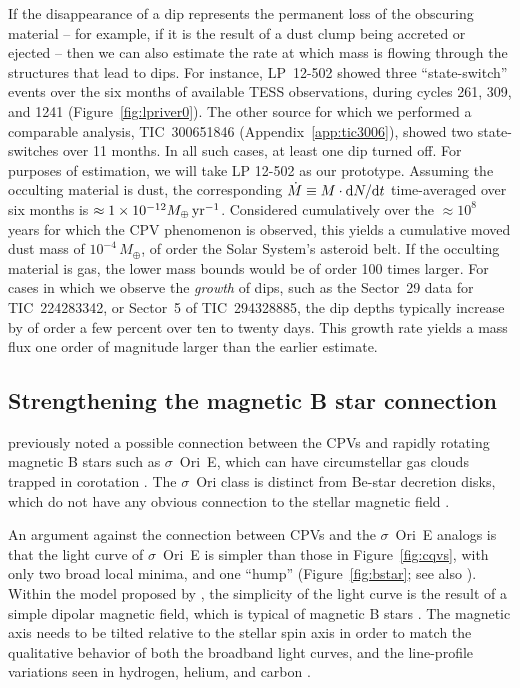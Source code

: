 \documentclass[11pt,twocolumn,tighten]{aastex63}
\begin{document}
If the disappearance of a dip represents the permanent loss of the
obscuring material -- for example, if it is the result of a dust clump
being accreted or ejected -- then we can also estimate the rate at
which mass is flowing through the structures that lead to dips.  For
instance, LP~12-502 showed three ``state-switch'' events over the six
months of available TESS observations, during cycles 261, 309, and
1241 (Figure~\ref{fig:lpriver0}).  The other source for which we
performed a comparable analysis, TIC~300651846
(Appendix~\ref{app:tic3006}), showed two state-switches over 11
months.  In all such cases, at least one dip turned off.  For purposes
of estimation, we will take LP 12-502 as our prototype.  Assuming the
occulting material is dust, the corresponding $\dot{M} \equiv M\cdot
{\rm d}N/{\rm d}t$ time-averaged over six months is
$\approx
1\times10^{-12} M_\oplus\,{\rm yr}^{-1}$.  Considered cumulatively
over the $\approx$$10^8$ years for which the CPV phenomenon is
observed, this yields a cumulative moved dust mass of
$10^{-4}\,M_\oplus$, of order the Solar System's asteroid belt.  If
the occulting material is gas, the lower mass bounds would be of order
100 times larger.  For cases in which we observe the {\it growth} of
dips, such as the Sector~29 data for TIC~224283342, or Sector~5 of
TIC~294328885, the dip depths typically increase by of order a few
percent over ten to twenty days.  This growth rate yields a mass flux
one order of magnitude larger than the earlier estimate.



\subsection{Strengthening the magnetic B star connection}

\citet{2017AJ....153..152S} previously noted a possible connection
between the CPVs and rapidly rotating magnetic B stars such as
$\sigma$~Ori~E, which can have circumstellar gas clouds trapped in
corotation \citep{2005ApJ...630L..81T}.  The $\sigma$~Ori class is
distinct from Be-star decretion disks, which do not have any obvious
connection to the stellar magnetic field \citep{2013A&ARv..21...69R}.

An argument against the connection between CPVs and the $\sigma$~Ori~E
analogs is that the light curve of $\sigma$~Ori~E is simpler than
those in Figure~\ref{fig:cqvs}, with only two broad local minima, and
one ``hump'' (Figure~\ref{fig:bstar}; see also
\citealt{2022ApJ...924L..10J}).  Within the model proposed by
\citeauthor{2005ApJ...630L..81T}, the simplicity of the light curve is
the result of a simple dipolar magnetic field, which is typical of
magnetic B stars \citep{2007A&A...475.1053A,2009ARA&A..47..333D}.  The
magnetic axis needs to be tilted relative to the stellar spin axis in
order to match the qualitative behavior of both the broadband light
curves, and the line-profile variations seen in hydrogen, helium, and
carbon \citep{2012MNRAS.419..959O}.
\end{document}
